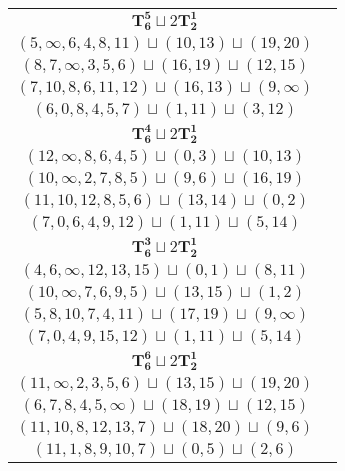\documentclass{article}
\begin{document}
\begin{longtable}{|c|c|}
        \hline
        $\mathbf{T_{6}^{5}} \sqcup 2\mathbf{T_{2}^{1}}$ & \begin{tabular}{c}
        $(3,2,4,5,0,1)\sqcup(18,15)\sqcup(11,14)$ \\ 
        $(5,\infty,6,4,8,11)\sqcup(10,13)\sqcup(19,20)$ \\ 
        $(8,7,\infty,3,5,6)\sqcup(16,19)\sqcup(12,15)$ \\ 
        $(7,10,8,6,11,12)\sqcup(16,13)\sqcup(9,\infty)$ \\ 
        $(6,0,8,4,5,7)\sqcup(1,11)\sqcup(3,12)$
        \end{tabular} \\ 
        \hline
        $\mathbf{T_{6}^{4}} \sqcup 2\mathbf{T_{2}^{1}}$ & \begin{tabular}{c}
        $(5,4,7,2,1,3)\sqcup(8,11)\sqcup(18,\infty)$ \\ 
        $(12,\infty,8,6,4,5)\sqcup(0,3)\sqcup(10,13)$ \\ 
        $(10,\infty,2,7,8,5)\sqcup(9,6)\sqcup(16,19)$ \\ 
        $(11,10,12,8,5,6)\sqcup(13,14)\sqcup(0,2)$ \\ 
        $(7,0,6,4,9,12)\sqcup(1,11)\sqcup(5,14)$
        \end{tabular} \\ 
        \hline
        $\mathbf{T_{6}^{3}} \sqcup 2\mathbf{T_{2}^{1}}$ & \begin{tabular}{c}
        $(5,4,2,3,6,0)\sqcup(9,12)\sqcup(11,\infty)$ \\ 
        $(4,6,\infty,12,13,15)\sqcup(0,1)\sqcup(8,11)$ \\ 
        $(10,\infty,7,6,9,5)\sqcup(13,15)\sqcup(1,2)$ \\ 
        $(5,8,10,7,4,11)\sqcup(17,19)\sqcup(9,\infty)$ \\ 
        $(7,0,4,9,15,12)\sqcup(1,11)\sqcup(5,14)$
        \end{tabular} \\ 
        \hline
        $\mathbf{T_{6}^{6}} \sqcup 2\mathbf{T_{2}^{1}}$ & \begin{tabular}{c}
        $(1,2,0,3,4,5)\sqcup(\infty,15)\sqcup(8,11)$ \\ 
        $(11,\infty,2,3,5,6)\sqcup(13,15)\sqcup(19,20)$ \\ 
        $(6,7,8,4,5,\infty)\sqcup(18,19)\sqcup(12,15)$ \\ 
        $(11,10,8,12,13,7)\sqcup(18,20)\sqcup(9,6)$ \\ 
        $(11,1,8,9,10,7)\sqcup(0,5)\sqcup(2,6)$

\end{tabular}
\end{longtable}
\end{document}

